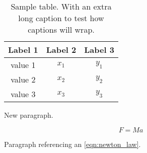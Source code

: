\begin{table}
  \centering
  \caption{Sample table. With an extra long caption to test how captions will wrap.}\label{tab:sample}
    \vspace{6pt} %
  \begin{tabular}{c c c}
    \hline
    Label 1 & Label 2 & Label 3 \\
    \hline\hline
    value 1 & $x_1$ & $y_1$ \\
    value 2 & $x_2$ & $y_2$ \\
    value 3 & $x_3$ & $y_3$ \\
    \hline
  \end{tabular}
\end{table}

New paragraph.

\begin{equation}\label{eqn:newton_law}
    F = Ma
\end{equation}

Paragraph referencing an \eqref{eqn:newton_law}.
